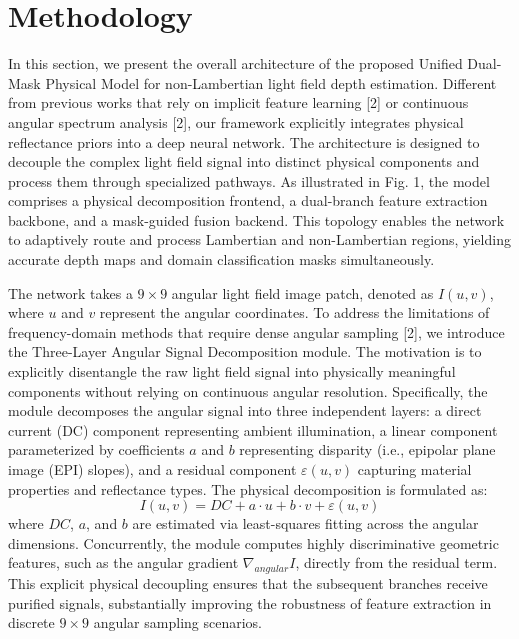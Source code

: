 \section{Methodology}

In this section, we present the overall architecture of the proposed Unified Dual-Mask Physical Model for non-Lambertian light field depth estimation. Different from previous works that rely on implicit feature learning [2] or continuous angular spectrum analysis [2], our framework explicitly integrates physical reflectance priors into a deep neural network. The architecture is designed to decouple the complex light field signal into distinct physical components and process them through specialized pathways. As illustrated in Fig. 1, the model comprises a physical decomposition frontend, a dual-branch feature extraction backbone, and a mask-guided fusion backend. This topology enables the network to adaptively route and process Lambertian and non-Lambertian regions, yielding accurate depth maps and domain classification masks simultaneously.

The network takes a $9 \times 9$ angular light field image patch, denoted as $I(u,v)$, where $u$ and $v$ represent the angular coordinates. To address the limitations of frequency-domain methods that require dense angular sampling [2], we introduce the Three-Layer Angular Signal Decomposition module. The motivation is to explicitly disentangle the raw light field signal into physically meaningful components without relying on continuous angular resolution. Specifically, the module decomposes the angular signal into three independent layers: a direct current (DC) component representing ambient illumination, a linear component parameterized by coefficients $a$ and $b$ representing disparity (i.e., epipolar plane image (EPI) slopes), and a residual component $\varepsilon(u,v)$ capturing material properties and reflectance types. The physical decomposition is formulated as:
\begin{equation}
\label{eq:eq2}
I(u,v) = DC + a \cdot u + b \cdot v + \varepsilon(u,v)
\end{equation}
where $DC$, $a$, and $b$ are estimated via least-squares fitting across the angular dimensions. Concurrently, the module computes highly discriminative geometric features, such as the angular gradient $\nabla_{angular} I$, directly from the residual term. This explicit physical decoupling ensures that the subsequent branches receive purified signals, substantially improving the robustness of feature extraction in discrete $9 \times 9$ angular sampling scenarios.

